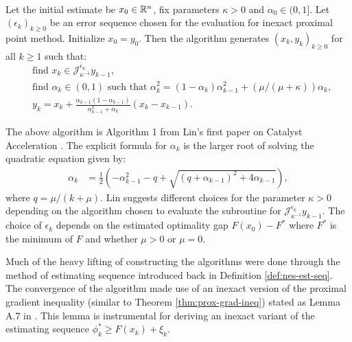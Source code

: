 \documentclass[12pt]{article}
\begin{document}
    \begin{definition}\label{def:lin-catalyst}\; \\
        Let the initial estimate be $x_0 \in \mathbb R^n$, fix parameters $\kappa > 0$ and $\alpha_0 \in (0, 1]$. 
        Let $(\epsilon_k)_{k \ge 0}$ be an error sequence chosen for the evaluation for inexact proximal point method. 
        Initialize $x_0 = y_0$. Then the algorithm generates $(x_k, y_k)_{k\ge 0}$ for all $k \ge 1$ such that: 
        \begin{align*}
            & \text{find } x_k \in \mathcal J_{\kappa^{-1}}^{\epsilon_k} y_{k - 1}, 
            \\
            & \text{find } \alpha_k \in (0, 1) \text{ such that } \alpha_k^2 = (1 - \alpha_k)\alpha_{k - 1}^2 + (\mu/(\mu + \kappa))\alpha_k,
            \\
            & 
            y_{k} = x_k + \frac{\alpha_{k - 1}(1 - \alpha_{k - 1})}{\alpha_{k - 1}^2 + \alpha_k}(x_k - x_{k - 1}). 
        \end{align*}
    \end{definition}
    \begin{remark}
        The above algorithm is Algorithm 1 from Lin's first paper on Catalyst Acceleration \cite{lin_universal_2015}. 
        The explicit formula for $\alpha_k$ is the larger root of solving the quadratic equation given by: 
        \begin{align*}
            \alpha_k &= 
            \frac{1}{2}\left(
                - \alpha_{k - 1}^2 - q + \sqrt{(q + \alpha_{k - 1})^2 + 4 \alpha_{k - 1}}
            \right), 
        \end{align*}
        where $q = \mu/(k + \mu)$. 
        Lin suggests different choices for the parameter $\kappa > 0$ depending on the algorithm chosen to evaluate the subroutine for $\mathcal J_{\kappa^{-1}}^{\epsilon_k}y_{k - 1}$. 
        The choice of $\epsilon_k$ depends on the estimated optimality gap $F(x_0) - F^*$ where $F^*$ is the minimum of $F$ and whether $\mu > 0$ or $\mu = 0$. 
    \end{remark}
    Much of the heavy lifting of constructing the algorithms were done through the method of estimating sequence introduced back in Definition \ref{def:nes-est-seq}. 
    The convergence of the algorithm made use of an inexact version of the proximal gradient inequality (similar to Theorem \ref{thm:prox-grad-ineq}) stated as Lemma A.7 in \cite{lin_universal_2015}. 
    This lemma is instrumental for deriving an inexact variant of the estimating sequence $\phi_k^* \ge F(x_k) + \xi_k$. 
\end{document}
